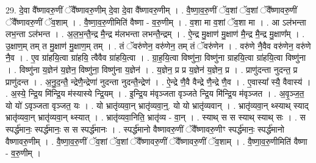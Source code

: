 \documentclass[17pt]{extarticle}
\begin{document}
29. दे॒वा वै᳚ष्णावरु॒णीं ॅवै᳚ष्णावरु॒णीम् दे॒वा दे॒वा वै᳚ष्णावरु॒णीम् । . वै॒ष्णा॒व॒रु॒णीं ॅव॒शां ॅव॒शां ॅवै᳚ष्णावरु॒णीं ॅवै᳚ष्णावरु॒णीं ॅव॒शाम् । . वै॒ष्णा॒व॒रु॒णीमिति॑ वैष्णा - व॒रु॒णीम् । . व॒शा मा व॒शां ॅव॒शा मा । . आ ऽल॑भन्ता लभ॒न्ता ऽल॑भन्त । . अ॒ल॒भ॒न्तै॒न्द्र मै॒न्द्र म॑लभन्ता लभन्तै॒न्द्रम् । . ऐ॒न्द्र मु॒क्षाण॑ मु॒क्षाण॑ मै॒न्द्र मै॒न्द्र मु॒क्षाण᳚म् । . उ॒क्षाण॒म् तम् त मु॒क्षाण॑ मु॒क्षाण॒म् तम् । . तं ॅवरु॑णेन॒ वरु॑णेन॒ तम् तं ॅवरु॑णेन । . वरु॑णे नै॒वैव वरु॑णेन॒ वरु॑णे नै॒व । . ए॒व ग्रा॑हयि॒त्वा ग्रा॑हयि॒ त्वैवैव ग्रा॑हयि॒त्वा । . ग्रा॒ह॒यि॒त्वा विष्णु॑ना॒ विष्णु॑ना ग्राहयि॒त्वा ग्रा॑हयि॒त्वा विष्णु॑ना । . विष्णु॑ना य॒ज्ञेन॑ य॒ज्ञेन॒ विष्णु॑ना॒ विष्णु॑ना य॒ज्ञेन॑ । . य॒ज्ञेन॒ प्र प्र य॒ज्ञेन॑ य॒ज्ञेन॒ प्र । . प्राणु॑दन्ता नुदन्त॒ प्र प्राणु॑दन्त । . अ॒नु॒द॒न्तै॒ न्द्रेणै॒न्द्रेणा॑ नुदन्ता नुदन्तै॒न्द्रेण॑ । . ऐ॒न्द्रे णै॒वै वैन्द्रे णै॒न्द्रे णै॒व । . ए॒वास्या᳚ स्यै॒ वैवास्य॑ । . अ॒स्ये॒ न्द्रि॒य मि॑न्द्रि॒य म॑स्यास्ये न्द्रि॒यम् । . इ॒न्द्रि॒य म॑वृञ्जता वृञ्जते न्द्रि॒य मि॑न्द्रि॒य म॑वृञ्जत । . अ॒वृ॒ञ्ज॒त॒ यो यो॑ ऽवृञ्जता वृञ्जत॒ यः । . यो भ्रातृ॑व्यवा॒न् भ्रातृ॑व्यवा॒न्॒. यो यो भ्रातृ॑व्यवान् । . भ्रातृ॑व्यवा॒न् थ्स्याथ् स्याद् भ्रातृ॑व्यवा॒न् भ्रातृ॑व्यवा॒न् थ्स्यात् । . भ्रातृ॑व्यवा॒निति॒ भ्रातृ॑व्य - वा॒न् । . स्याथ् स स स्याथ् स्याथ् सः । . स स्पर्द्ध॑मानः॒ स्पर्द्ध॑मानः॒ स स स्पर्द्ध॑मानः । . स्पर्द्ध॑मानो वैष्णावरु॒णीं ॅवै᳚ष्णावरु॒णीꣳ स्पर्द्ध॑मानः॒ स्पर्द्ध॑मानो वैष्णावरु॒णीम् । . वै॒ष्णा॒व॒रु॒णीं ॅव॒शां ॅव॒शां ॅवै᳚ष्णावरु॒णीं ॅवै᳚ष्णावरु॒णीं ॅव॒शाम् । . वै॒ष्णा॒व॒रु॒णीमिति॑ वैष्णा - व॒रु॒णीम् । \newline
\end{document}
